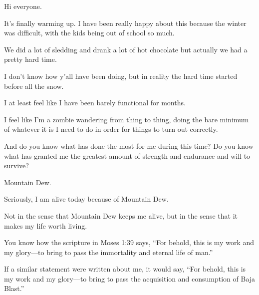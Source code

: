 		\begin{compactitem}
		
			\item Hi everyone. 
				\begin{compactitem} 
					\item It's finally warming up. I have been really happy about this because the winter was difficult, with the kids being out of school so much. 
					\item We did a lot of sledding and drank a lot of hot chocolate but actually we had a pretty hard time.
					\item I don't know how y'all have been doing, but in reality the hard time started before all the snow.
					\item I at least feel like I have been barely functional for months.
					\item I feel like I'm a zombie wandering from thing to thing, doing the bare minimum of whatever it is I need to do in order for things to turn out correctly.
					\item And do you know what has done the most for me during this time? Do you know what has granted me the greatest amount of strength and endurance and will to survive?
					\item Mountain Dew.
					\item Seriously, I am alive today because of Mountain Dew.
					\item Not in the sense that Mountain Dew keeps me alive, but in the sense that it makes my life worth living.
					\item You know how the scripture in Moses 1:39 says, ``For behold, this is my work and my glory---to bring to pass the immortality and eternal life of man.''
					\item If a similar statement were written about me, it would say, ``For behold, this is my work and my glory---to bring to pass the acquisition and consumption of Baja Blast.''
				\end{compactitem}
				

\end{compactitem}
